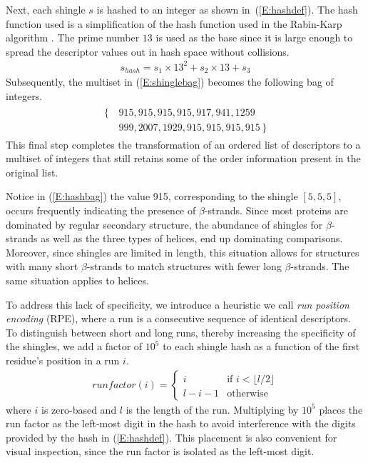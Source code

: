 \documentclass[10pt,letterpaper]{article}
\begin{document}
Next, each shingle $s$ is hashed to an integer as shown in~(\ref{E:hashdef}). 
The hash function used is a simplification of the hash function used in the Rabin-Karp algorithm \cite{Karp1987}.
The prime number $13$ is used as the base since it is large enough to spread the descriptor values out in hash space without collisions. 
\begin{gather}\label{E:hashdef}
    s_{hash} = s_1 \times 13^2 + s_2 \times 13 + s_3
\end{gather}
Subsequently, the multiset in (\ref{E:shinglebag}) becomes the following bag of integers.
\begin{align}\label{E:hashbag}
    \begin{split}
    \{\,&915, 915, 915, 915, 917, 941, 1259 \\
        &999, 2007, 1929, 915, 915, 915, 915 \,\}
    \end{split}
\end{align}
This final step completes the transformation of an ordered list of descriptors to a multiset of integers that still retains some of the order information present in the original list. 

Notice in (\ref{E:hashbag}) the value 915, corresponding to the shingle $[ 5, 5, 5 ]$, occurs frequently indicating the presence of $\beta$-strands. 
Since most proteins are dominated by regular secondary structure, the abundance of shingles for $\beta$-strands as well as the three types of helices, end up dominating comparisons. 
Moreover, since shingles are limited in length, this situation allows for structures with many short $\beta$-strands to match structures with fewer long $\beta$-strands.
The same situation applies to helices. 

To address this lack of specificity, we introduce a heuristic we call \emph{run position encoding} (RPE), where a run is a consecutive sequence of identical descriptors. 
To distinguish between short and long runs, thereby increasing the specificity of the shingles, we add a factor of $10^5$ to each shingle hash as a function of the first residue's position in a run $i$. 
\begin{gather}
    runfactor(i) = 
    \begin{cases}
        i               &\text{if $i < \lfloor l/2 \rfloor$}\\
        l - i - 1       &\text{otherwise} 
    \end{cases}
\end{gather}
where $i$ is zero-based and $l$ is the length of the run.
Multiplying by $10^5$ places the run factor as the left-most digit in the hash to avoid interference with the digits provided by the hash in (\ref{E:hashdef}).
This placement is also convenient for visual inspection, since the run factor is isolated as the left-most digit. 
\end{document}

